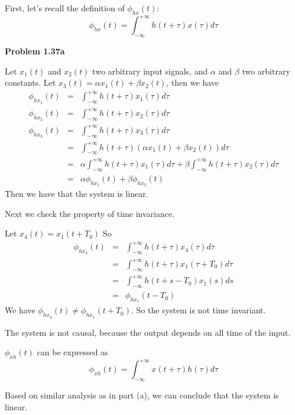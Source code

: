 \documentclass[koma,a4paper,utopia,12pt,listings-color,microtype,paralist,colorlinks,urlcolor=red]{org-article}
\begin{document}
First, let's recall the definition of \(\phi_{hx}(t)\):
\begin{equation*}
\phi_{hx}(t) = \int_{-\infty}^{+\infty} h(t + \tau)x(\tau)d\tau
\end{equation*}

\textbf{Problem 1.37a}


Let \(x_{1}(t)\) and \(x_{2}(t)\) two arbitrary input signals, and \(\alpha\)
and \(\beta\) two arbitrary constants. Let \(x_{3}(t) = \alpha x_{1}(t) + \beta
x_{2}(t)\), then we have
\begin{eqnarray*}
\phi_{hx_{1}}(t) &=& \int_{-\infty}^{+\infty} h(t+\tau)x_{1}(\tau)d\tau \\
\phi_{hx_{2}}(t) &=& \int_{-\infty}^{+\infty} h(t+\tau)x_{2}(\tau)d\tau \\
\phi_{hx_{3}}(t) &=& \int_{-\infty}^{+\infty} h(t+\tau)x_{3}(\tau)d\tau \\
&=& \int_{-\infty}^{+\infty} h(t+\tau)( \alpha x_{1}(t) + \beta x_{2}(t) )d\tau \\
&=& \alpha \int_{-\infty}^{+\infty} h(t+\tau)x_{1}(\tau)d\tau  + \beta \int_{-\infty}^{+\infty} h(t+\tau)x_{2}(\tau)d\tau \\
&=& \alpha \phi_{hx_{1}}(t) + \beta \phi_{hx_{2}}(t)
\end{eqnarray*}
Then we have that the system is linear.

Next we check the property of time invariance.

Let \(x_{4}(t) = x_{1}(t+T_{0})\) So
\begin{eqnarray*}
\phi_{hx_{4}}(t) &=& \int_{-\infty}^{+\infty} h(t+\tau)x_{4}(\tau)d\tau \\
&=& \int_{-\infty}^{+\infty} h(t+\tau)x_{1}(\tau + T_{0})d\tau \\
&=& \int_{-\infty}^{+\infty} h(t+s-T_{0})x_{1}(s)ds \\
&=& \phi_{hx_{1}}(t-T_{0})
\end{eqnarray*}
We have \(\phi_{hx_{4}}(t)\neq \phi_{hx_{1}}(t+T_{0})\). So the system is not
time invariant.

The system is not causal, because the output depends on all time of the input.

\(\phi_{xh}(t)\) can be expressed as
\begin{equation*}
\phi_{xh}(t) = \int_{-\infty}^{+\infty} x(t+ \tau) h(\tau)d\tau
\end{equation*}

Based on similar analysis as in part (a), we can conclude that the system is
linear.
\end{document}
